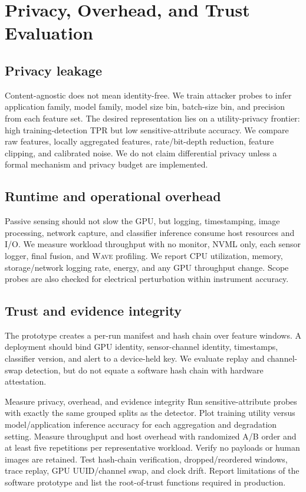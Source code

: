 \documentclass[sigplan,anonymous,review,nonacm]{acmart}
\newcommand{\wave}{\textsc{Wave}}
\begin{document}
\section{Privacy, Overhead, and Trust Evaluation}
\label{sec:privacy}

\subsection{Privacy leakage}

Content-agnostic does not mean identity-free. We train attacker probes to infer application family, model family, model size bin, batch-size bin, and precision from each feature set. The desired representation lies on a utility-privacy frontier: high training-detection TPR but low sensitive-attribute accuracy. We compare raw features, locally aggregated features, rate/bit-depth reduction, feature clipping, and calibrated noise. We do not claim differential privacy unless a formal mechanism and privacy budget are implemented.

\subsection{Runtime and operational overhead}

Passive sensing should not slow the GPU, but logging, timestamping, image processing, network capture, and classifier inference consume host resources and I/O. We measure workload throughput with no monitor, NVML only, each sensor logger, final fusion, and \wave{} profiling. We report CPU utilization, memory, storage/network logging rate, energy, and any GPU throughput change. Scope probes are also checked for electrical perturbation within instrument accuracy.

\subsection{Trust and evidence integrity}

The prototype creates a per-run manifest and hash chain over feature windows. A deployment should bind GPU identity, sensor-channel identity, timestamps, classifier version, and alert to a device-held key. We evaluate replay and channel-swap detection, but do not equate a software hash chain with hardware attestation.

\begin{experimentbox}{Measure privacy, overhead, and evidence integrity}
Run sensitive-attribute probes with exactly the same grouped splits as the detector. Plot training utility versus model/application inference accuracy for each aggregation and degradation setting. Measure throughput and host overhead with randomized A/B order and at least five repetitions per representative workload. Verify no payloads or human images are retained. Test hash-chain verification, dropped/reordered windows, trace replay, GPU UUID/channel swap, and clock drift. Report limitations of the software prototype and list the root-of-trust functions required in production.
\end{experimentbox}
\end{document}
